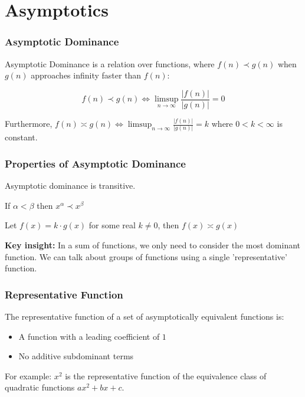 \documentclass{beamer}
\begin{document}

\section{Asymptotics}

\begin{frame}
  \frametitle{Asymptotic Dominance}
  
  \begin{definition}
    Asymptotic Dominance is a relation over functions, where $f(n) \prec g(n)$ when $g(n)$ approaches infinity faster than $f(n)$:
    
    $$f(n) \prec g(n) \iff \limsup_{n \to \infty} \frac{|f(n)|}{|g(n)|} = 0$$
    
    Furthermore, $f(n) \asymp g(n) \iff \limsup_{n \to \infty} \frac{|f(n)|}{|g(n)|} = k$ where $0 < k < \infty$ is constant.
  \end{definition}
\end{frame}

\begin{frame}
  \frametitle{Properties of Asymptotic Dominance}
  
  \begin{corollary}
    Asymptotic dominance is transitive.
  \end{corollary}
  
  \begin{corollary}
    If $\alpha < \beta$ then $x^\alpha \prec x^\beta$
  \end{corollary}
  
  \begin{corollary}
    Let $f(x) = k \cdot g(x)$ for some real $k \neq 0$, then $f(x) \asymp g(x)$
  \end{corollary}
  
  \vspace{0.3cm}
  
  \textbf{Key insight:} In a sum of functions, we only need to consider the most dominant function. We can talk about groups of functions using a single 'representative' function.
\end{frame}

\begin{frame}
  \frametitle{Representative Function}
  
  \begin{definition}
    The representative function of a set of asymptotically equivalent functions is:
    \begin{itemize}
      \item A function with a leading coefficient of $1$
      \item No additive subdominant terms
    \end{itemize}
    
    For example: $x^2$ is the representative function of the equivalence class of quadratic functions $ax^2 + bx + c$.
  \end{definition}
\end{frame}
\end{document}
